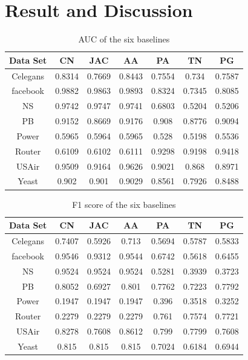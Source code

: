 \documentclass[12pt]{article}
\begin{document}
	
	\section{Result and Discussion}
	\begin{table}
		\begin{center}
			\begin{tabular}{|c|c|c|c|c|c|c|}
				\hline
				Data Set & CN & JAC & AA & PA  & TN & PG \\
				\hline
				Celegans&0.8314&0.7669&0.8443&0.7554&0.734&0.7587\\
				facebook&0.9882&0.9863&0.9893&0.8324&0.7345&0.8085\\
				NS&0.9742&0.9747&0.9741&0.6803&0.5204&0.5206\\
				PB&0.9152&0.8669&0.9176&0.908&0.8776&0.9094\\
				Power&0.5965&0.5964&0.5965&0.528&0.5198&0.5536\\
				Router&0.6109&0.6102&0.6111&0.9298&0.9198&0.9418\\
				USAir&0.9509&0.9164&0.9626&0.9021&0.868&0.8971\\
				Yeast&0.902&0.901&0.9029&0.8561&0.7926&0.8488\\
				\hline
			\end{tabular}
		\end{center}
		\caption{AUC of the six baselines}
		\label{tab:auc}
	\end{table}
	
	\begin{table}
		\begin{center}
			\begin{tabular}{|c|c|c|c|c|c|c|}
				\hline
				Data Set & CN & JAC & AA & PA & TN & PG \\
				\hline
				Celegans&0.7407&0.5926&0.713&0.5694&0.5787&0.5833\\
				facebook&0.9546&0.9312&0.9544&0.6742&0.5618&0.6455\\
				NS&0.9524&0.9524&0.9524&0.5281&0.3939&0.3723\\
				PB&0.8052&0.6927&0.801&0.7762&0.7223&0.7792\\
				Power&0.1947&0.1947&0.1947&0.396&0.3518&0.3252\\
				Router&0.2279&0.2279&0.2279&0.761&0.7574&0.7721\\
				USAir&0.8278&0.7608&0.8612&0.799&0.7799&0.7608\\
				Yeast&0.815&0.815&0.815&0.7024&0.6184&0.6944\\
				\hline
			\end{tabular}
		\end{center}
		\caption{F1 score of the six baselines}
		\label{tab:f1}
	\end{table}
	
\end{document}
